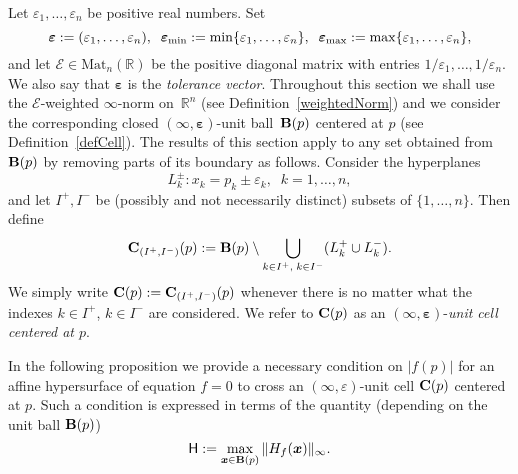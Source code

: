 \documentclass[10pt]{article}
\newcommand{\x}{{\bm x}}
\newcommand\R{{\mathbb R}}
\newcommand{\epsbold}{{\bm \varepsilon}}
\begin{document}
Let $\varepsilon_1,\ldots,\varepsilon_n$ be positive real numbers. 
Set  $${\epsbold:=(\varepsilon_1,\ldots,\varepsilon_n)}, \;\;
\epsbold_{{\rm min}}:= \min \{\varepsilon_1,\ldots,\varepsilon_n\},\;\;
\epsbold_{{\rm max}}:= \max \{\varepsilon_1,\ldots,\varepsilon_n\},$$
and let  ${\mathcal E} \in \textrm{Mat}_n(\R)$ be the positive diagonal matrix 
with entries $1/\varepsilon_1,\ldots,1/\varepsilon_n$. We also say that $\epsbold$ is the {\em tolerance vector}.
Throughout this section we shall use the ${\mathcal E}$-weighted $\infty$-norm 
on~$\R^n$ (see Definition~\ref{weightedNorm}) and we consider 
the corresponding closed  $(\infty,\epsbold)$-unit ball~${\bf B}(p)$ centered at $p$ 
(see Definition~\ref{defCell}). 
The results of this section apply to any set 
obtained from~${\bf B}(p)$ by removing  parts of its boundary as follows.
Consider the hyperplanes
$$L_k^{\pm}: x_k=p_k\pm \varepsilon_k, \;\; k=1,\ldots,n,$$
and let  $I^{+}, I^{-}$  be (possibly and not necessarily distinct) subsets of $\{1,\ldots,n\}$.
Then  define
\begin{equation}\label{neighP}
{\bf C}_{( I^{+}, I^{-})}(p):={\bf B}(p)\setminus\bigcup_{k\in I^{+},\;k\in I^{-}}(L_k^{+}\cup L_k^{-}).\end{equation}
 We simply write ${\bf C}(p):=
{\bf C}_{(I^{+}, I^{-})}(p)$ whenever there is no matter  what the indexes $k\in I^{+}$, $k\in I^{-}$ are considered. We  refer to  ${\bf C}(p)$ as an  $(\infty,\epsbold)$-{\em unit cell  centered at $p$}.

In the following proposition we provide a necessary  condition 
on $|f(p)|$ for  an  affine hypersurface of equation $f=0$  to cross  an $(\infty,\varepsilon)$-unit cell ${\bf C}(p)$ centered at $p$. 
Such a condition is expressed in terms of the quantity (depending on   the unit ball ${\bf B}(p)$)
\begin{equation}\label{gamma}
{\mathsf H}: = \max_{\x \in {\bf B}(p)} \|H_f(\bm x)\|_\infty.
\end{equation}
\end{document}

